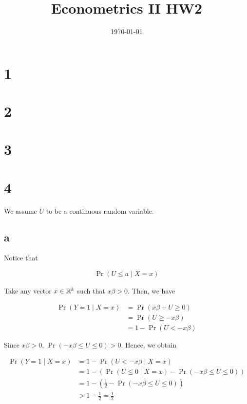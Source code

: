 \documentclass[11pt]{article}
\begin{document}
\title{Econometrics II HW2} %
\author{}  %
\date{\today}

\maketitle

\pagebreak

\section*{1}

\section*{2}
\section*{3}



\section*{4}

We assume $U$ to be a continuous random variable.

\subsection{a}\label{q:4_a}

Notice that

\begin{align*}
    \Pr(U \leq a \mid X = x)
\end{align*}

Take any vector $x\in \mathbb{R}^k$ such that $x\beta > 0$. Then, we have

\begin{align*}
    \Pr(Y = 1 \mid X = x)
    &= \Pr(x\beta + U \geq 0) \\
    &= \Pr(U \geq - x\beta) \\
    &= 1 - \Pr(U < - x\beta)
\end{align*}

Since $x\beta > 0$, $\Pr(- x\beta \leq U \leq 0) > 0$. Hence, we obtain

\begin{align*}
    \Pr(Y = 1 \mid X = x)
    &= 1 - \Pr(U < - x\beta \mid X = x) \\
    &= 1 - \left( \Pr(U \leq 0 \mid X = x) - \Pr(- x\beta \leq U \leq 0) \right) \\
    &= 1 - \left( \frac{1}{2} - \Pr(- x\beta \leq U \leq 0) \right) \\
    &> 1 - \frac{1}{2} = \frac{1}{2}
\end{align*}
\end{document}
